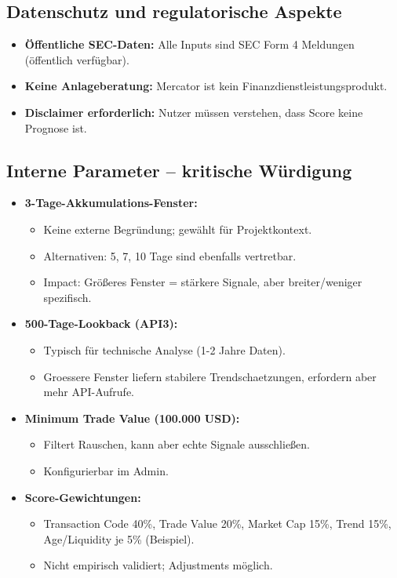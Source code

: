 \subsection{Datenschutz und regulatorische Aspekte}
\begin{itemize}
  \item \textbf{Öffentliche SEC-Daten:} Alle Inputs sind SEC Form 4 Meldungen (öffentlich verfügbar). %
  \item \textbf{Keine Anlageberatung:} Mercator ist kein Finanzdienstleistungsprodukt. %
  \item \textbf{Disclaimer erforderlich:} Nutzer müssen verstehen, dass Score keine Prognose ist. %
\end{itemize}

\subsection{Interne Parameter -- kritische Würdigung}
\begin{itemize}
  \item \textbf{3-Tage-Akkumulations-Fenster:} %
    \begin{itemize}
      \item Keine externe Begründung; gewählt für Projektkontext.
      \item Alternativen: 5, 7, 10 Tage sind ebenfalls vertretbar. %
      \item Impact: Größeres Fenster = stärkere Signale, aber breiter/weniger spezifisch.
    \end{itemize}
  \item \textbf{500-Tage-Lookback (API3):} %
    \begin{itemize}
      \item Typisch für technische Analyse (1-2 Jahre Daten).
      \item Groessere Fenster liefern stabilere Trendschaetzungen, erfordern aber mehr API-Aufrufe.
    \end{itemize}
  \item \textbf{Minimum Trade Value (100.000 USD):} %
    \begin{itemize}
      \item Filtert Rauschen, kann aber echte Signale ausschließen.
      \item Konfigurierbar im Admin. %
    \end{itemize}
  \item \textbf{Score-Gewichtungen:} %
    \begin{itemize}
      \item Transaction Code 40\%, Trade Value 20\%, Market Cap 15\%, Trend 15\%, Age/Liquidity je 5\% (Beispiel).
      \item Nicht empirisch validiert; Adjustments möglich.
    \end{itemize}
\end{itemize}

